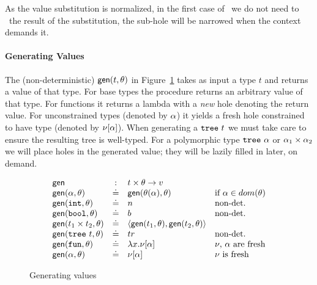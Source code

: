 %
As the value substitution is normalized, in the first case of \forcesym\ we
do not need to \forcesym\ the result of the substitution, the sub-hole
will be narrowed when the context demands it.

\paragraph{Generating Values} The (non-deterministic)
$\mathsf{gen}(t,\theta)$ in Figure~\ref{fig:gen} takes
as input a type $t$ and returns a value of that type.
%
For base types the procedure returns an arbitrary value of
that type.
%
For functions it returns a lambda with a \emph{new} hole
denoting the return value.
%
For unconstrained types (denoted
by $\alpha$) it yields a fresh hole constrained to have type
\thole (denoted by $\nu[\alpha]$).
%
When generating a $\mathtt{tree}\ t$ we must take care to ensure
the resulting tree is well-typed.
%
For a polymorphic type $\mathtt{tree}\ \alpha$ %
or $\alpha_1 \times \alpha_2$
we will place holes in the generated value; they will be lazily filled
in later, on demand.


\begin{figure}[t]
$$
\begin{array}{lcll}
\gensym       & :   & t \times \tsu \rightarrow v \\
\gen{\thole}{\tsu}  & \defeq  & \gen{\subst{\tsu}{\thole}}{\tsu} &  \text{if } \thole \in dom(\tsu) \\
\gen{\tint}{\tsu}   & \defeq  & n &  \text{non-det.} \\
\gen{\tbool}{\tsu}  & \defeq  & b &  \text{non-det.} \\
\gen{\tprod{t_1}{t_2}}{\tsu}  & \defeq  & \epair{\gen{t_1}{\tsu}}{\gen{t_2}{\tsu}} & \\ %
\gen{\ttree{t}}{\tsu}  & \defeq  & tr &  \text{non-det.} \\
\gen{\tfun}{\tsu}   & \defeq & \efun{x}{\vhole{\thole}} &  \text{\ehole, \thole are fresh} \\
\gen{\thole}{\tsu}  & \defeq & \vhole{\thole} & \text{\ehole is fresh} \\
\end{array}
$$
\caption{Generating values}
\label{fig:gen}
\end{figure}


